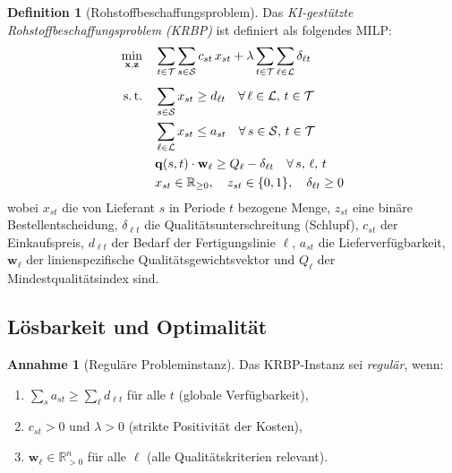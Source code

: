 ﻿\documentclass[12pt,a4paper]{article}
\theoremstyle{plain}
\theoremstyle{definition}
\newtheorem{definition}[theorem]{Definition}
\newtheorem{assumption}[theorem]{Annahme}
\begin{document}
	\begin{definition}[Rohstoffbeschaffungsproblem]
		Das \emph{KI-gestützte Rohstoffbeschaffungsproblem (KRBP)} ist definiert
		als folgendes MILP:
		\begin{align}
			\min_{\mathbf{x}, \mathbf{z}} \quad
			& \sum_{t \in \mathcal{T}} \sum_{s \in \mathcal{S}}
			c_{st}\, x_{st} + \lambda \sum_{t \in \mathcal{T}} \sum_{\ell \in \mathcal{L}}
			\delta_{\ell t}
			\label{eq:milp_obj} \\[4pt]
			\text{s.\,t.} \quad
			& \sum_{s \in \mathcal{S}} x_{st} \geq d_{\ell t}
			\quad \forall\, \ell \in \mathcal{L},\, t \in \mathcal{T}
			\label{eq:demand} \\
			& \sum_{\ell \in \mathcal{L}} x_{st} \leq a_{st}
			\quad \forall\, s \in \mathcal{S},\, t \in \mathcal{T}
			\label{eq:supply} \\
			& \mathbf{q}(s,t) \cdot \mathbf{w}_\ell \geq Q_\ell - \delta_{\ell t}
			\quad \forall\, s,\, \ell,\, t
			\label{eq:quality} \\
			& x_{st} \in \mathbb{R}_{\geq 0}, \quad
			z_{st} \in \{0, 1\}, \quad
			\delta_{\ell t} \geq 0
			\label{eq:domains}
		\end{align}
		wobei $x_{st}$ die von Lieferant $s$ in Periode $t$ bezogene Menge,
		$z_{st}$ eine binäre Bestellentscheidung, $\delta_{\ell t}$ die
		Qualitätsunterschreitung (Schlupf), $c_{st}$ der Einkaufspreis,
		$d_{\ell t}$ der Bedarf der Fertigungslinie $\ell$, $a_{st}$ die
		Lieferverfügbarkeit, $\mathbf{w}_\ell$ der linienspezifische
		Qualitätsgewichtsvektor und $Q_\ell$ der Mindestqualitätsindex sind.
	\end{definition}
	
	\subsection{Lösbarkeit und Optimalität}
	
	\begin{assumption}[Reguläre Probleminstanz]
		\label{ass:regular}
		Das KRBP-Instanz sei \emph{regulär}, wenn:
		\begin{enumerate}[label=(\roman*)]
			\item $\sum_{s} a_{st} \geq \sum_\ell d_{\ell t}$ für alle $t$
			(globale Verfügbarkeit),
			\item $c_{st} > 0$ und $\lambda > 0$ (strikte Positivität der Kosten),
			\item $\mathbf{w}_\ell \in \mathbb{R}_{>0}^n$ für alle $\ell$
			(alle Qualitätskriterien relevant).
		\end{enumerate}
	\end{assumption}
	
\end{document}
